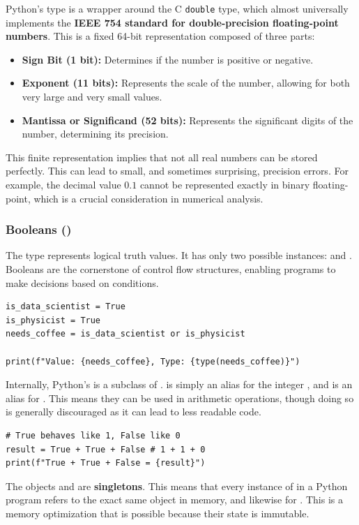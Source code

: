 \begin{remark}
Python's  type is a wrapper around the C \texttt{double} type, which almost universally implements the \textbf{IEEE 754 standard for double-precision floating-point numbers}. This is a fixed 64-bit representation composed of three parts:
\begin{itemize}
    \item \textbf{Sign Bit (1 bit):} Determines if the number is positive or negative.
    \item \textbf{Exponent (11 bits):} Represents the scale of the number, allowing for both very large and very small values.
    \item \textbf{Mantissa or Significand (52 bits):} Represents the significant digits of the number, determining its precision.
\end{itemize}
This finite representation implies that not all real numbers can be stored perfectly. This can lead to small, and sometimes surprising, precision errors. For example, the decimal value $0.1$ cannot be represented exactly in binary floating-point, which is a crucial consideration in numerical analysis.
\end{remark}

\subsubsection*{Booleans ()}
The  type represents logical truth values. It has only two possible instances:  and . Booleans are the cornerstone of control flow structures, enabling programs to make decisions based on conditions.

\text{ }\begin{verbatim}
is_data_scientist = True
is_physicist = True
needs_coffee = is_data_scientist or is_physicist

print(f"Value: {needs_coffee}, Type: {type(needs_coffee)}")
\end{verbatim}

\begin{remark}
Internally, Python's  is a subclass of .  is simply an alias for the integer , and  is an alias for . This means they can be used in arithmetic operations, though doing so is generally discouraged as it can lead to less readable code.
\text{ }\begin{verbatim}
# True behaves like 1, False like 0
result = True + True + False # 1 + 1 + 0
print(f"True + True + False = {result}")
\end{verbatim}
The objects  and  are \textbf{singletons}. This means that every instance of  in a Python program refers to the exact same object in memory, and likewise for . This is a memory optimization that is possible because their state is immutable.
\end{remark}

